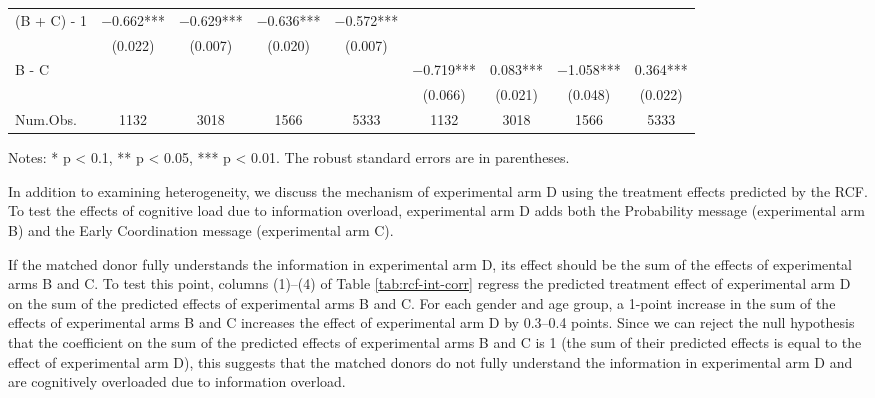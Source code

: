 \documentclass[
]{article}
\begin{document}
\begin{table}
\begin{threeparttable}
\begin{tabular}[t]{lcccccccc}
\hspace{1em}(B + C) - 1 & \num{-0.662}*** & \num{-0.629}*** & \num{-0.636}*** & \num{-0.572}*** &  &  &  & \\
\hspace{1em} & (\num{0.022}) & (\num{0.007}) & (\num{0.020}) & (\num{0.007}) &  &  &  & \\
\hspace{1em}B - C &  &  &  &  & \num{-0.719}*** & \num{0.083}*** & \num{-1.058}*** & \num{0.364}***\\
\hspace{1em} &  &  &  &  & (\num{0.066}) & (\num{0.021}) & (\num{0.048}) & (\num{0.022})\\
\midrule
Num.Obs. & \num{1132} & \num{3018} & \num{1566} & \num{5333} & \num{1132} & \num{3018} & \num{1566} & \num{5333}\\
\bottomrule
\end{tabular}
\begin{tablenotes}
\item Notes: * p < 0.1, ** p < 0.05, *** p < 0.01. The robust standard errors are in parentheses. 
\end{tablenotes}
\end{threeparttable}
\end{table}

In addition to examining heterogeneity, we discuss the mechanism of experimental arm D using the treatment effects predicted by the RCF. To test the effects of cognitive load due to information overload, experimental arm D adds both the Probability message (experimental arm B) and the Early Coordination message (experimental arm C).

If the matched donor fully understands the information in experimental arm D, its effect should be the sum of the effects of experimental arms B and C. To test this point, columns (1)--(4) of Table \ref{tab:rcf-int-corr} regress the predicted treatment effect of experimental arm D on the sum of the predicted effects of experimental arms B and C. For each gender and age group, a 1-point increase in the sum of the effects of experimental arms B and C increases the effect of experimental arm D by 0.3--0.4 points. Since we can reject the null hypothesis that the coefficient on the sum of the predicted effects of experimental arms B and C is 1 (the sum of their predicted effects is equal to the effect of experimental arm D), this suggests that the matched donors do not fully understand the information in experimental arm D and are cognitively overloaded due to information overload.
\end{document}
